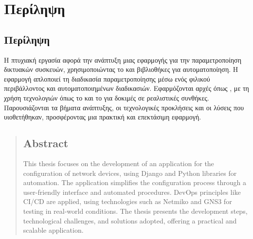\chapter{Περίληψη}
\section{Περίληψη}

Η πτυχιακή εργασία αφορά την ανάπτυξη μιας εφαρμογής για την παραμετροποίηση δικτυακών συσκευών, χρησιμοποιώντας το  και βιβλιοθήκες  για αυτοματοποίηση. Η εφαρμογή απλοποιεί τη διαδικασία παραμετροποίησης μέσω ενός φιλικού περιβάλλοντος και αυτοματοποιημένων διαδικασιών. Εφαρμόζονται αρχές  όπως , με τη χρήση τεχνολογιών όπως το  και το  για δοκιμές σε ρεαλιστικές συνθήκες. Παρουσιάζονται τα βήματα ανάπτυξης, οι τεχνολογικές προκλήσεις και οι λύσεις που υιοθετήθηκαν, προσφέροντας μια πρακτική και επεκτάσιμη εφαρμογή.

\vspace{0.3cm}  %

\noindent
\begin{minipage}[t]{\textwidth}  %
    \vspace{0cm}  %
    
    \begin{abstract}
    \section*{Abstract}

    This thesis focuses on the development of an application for the configuration of network devices, using Django and Python libraries for automation. The application simplifies the configuration process through a user-friendly interface and automated procedures. DevOps principles like CI/CD are applied, using technologies such as Netmiko and GNS3 for testing in real-world conditions. The thesis presents the development steps, technological challenges, and solutions adopted, offering a practical and scalable application.
    \end{abstract}
    
\end{minipage}

\clearpage

